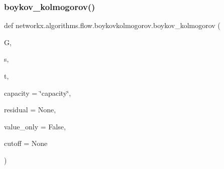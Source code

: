 \subsubsection{\texorpdfstring{boykov\+\_\+kolmogorov()}{boykov\_kolmogorov()}}
{\footnotesize\ttfamily def networkx.\+algorithms.\+flow.\+boykovkolmogorov.\+boykov\+\_\+kolmogorov (\begin{DoxyParamCaption}\item[{}]{G,  }\item[{}]{s,  }\item[{}]{t,  }\item[{}]{capacity = {\ttfamily \char`\"{}capacity\char`\"{}},  }\item[{}]{residual = {\ttfamily None},  }\item[{}]{value\+\_\+only = {\ttfamily False},  }\item[{}]{cutoff = {\ttfamily None} }\end{DoxyParamCaption})}

